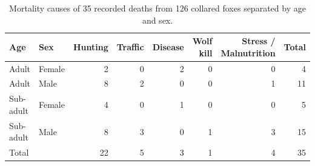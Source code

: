 
\begin{table}[t]
    \centering
    \captionsetup{font=scriptsize}
    \caption{Mortality causes of 35 recorded deaths from 126 collared foxes separated by age and sex.}
    \label{table:mort}
    \scriptsize
    \begin{tabular}{llrrrrr|r}
        \toprule
        Age       & Sex    & Hunting & Traffic & Disease & Wolf kill & Stress / Malnutrition & Total \\
        \midrule
        Adult     & Female & 2       & 0       & 2       & 0         & 0                     & 4     \\
        Adult     & Male   & 8       & 2       & 0       & 0         & 1                     & 11    \\
        Sub-adult & Female & 4       & 0       & 1       & 0         & 0                     & 5     \\
        Sub-adult & Male   & 8       & 3       & 0       & 1         & 3                     & 15    \\
        \midrule
        Total     &        & 22      & 5       & 3       & 1         & 4                     & 35    \\
        \bottomrule
    \end{tabular}
\end{table}
